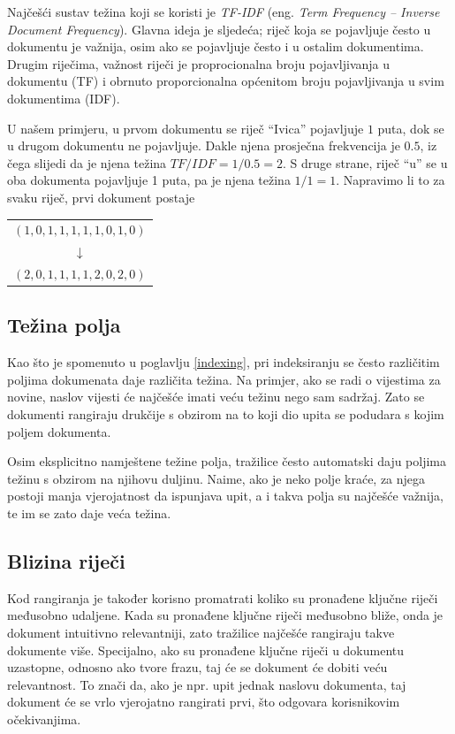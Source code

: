 \documentclass[a4paper,twoside,12pt]{scrreprt}
\newenvironment{nscenter}
 {\par\nopagebreak\centering}
 {\parskip=0pt\par\noindent\ignorespacesafterend}
\begin{document}
Najčešći sustav težina koji se koristi je \textit{TF-IDF} (eng. \textit{Term Frequency – Inverse Document Frequency}). Glavna ideja je sljedeća; riječ koja se pojavljuje često u dokumentu je važnija, osim ako se pojavljuje često i u ostalim dokumentima. Drugim riječima, važnost riječi je proprocionalna broju pojavljivanja u dokumentu (TF) i obrnuto proporcionalna općenitom broju pojavljivanja u svim dokumentima (IDF).

U našem primjeru, u prvom dokumentu se riječ ``Ivica'' pojavljuje $1$ puta, dok se u drugom dokumentu ne pojavljuje. Dakle njena prosječna frekvencija je $0.5$, iz čega slijedi da je njena težina $TF / IDF = 1 / 0.5 = 2$. S druge strane, riječ ``u'' se u oba dokumenta pojavljuje 1 puta, pa je njena težina $1 / 1 = 1$. Napravimo li to za svaku riječ, prvi dokument postaje

\begin{nscenter}
  \begin{tabular}{c}
    $(1,0,1,1,1,1,1,0,1,0)$ \\
    $\downarrow$            \\
    $(2,0,1,1,1,1,2,0,2,0)$ \\
  \end{tabular}
\end{nscenter}

\subsection{Težina polja}

Kao što je spomenuto u poglavlju \ref{indexing}, pri indeksiranju se često različitim poljima dokumenata daje različita težina. Na primjer, ako se radi o vijestima za novine, naslov vijesti će najčešće imati veću težinu nego sam sadržaj. Zato se dokumenti rangiraju drukčije s obzirom na to koji dio upita se podudara s kojim poljem dokumenta.

Osim eksplicitno namještene težine polja, tražilice često automatski daju poljima težinu s obzirom na njihovu duljinu. Naime, ako je neko polje kraće, za njega postoji manja vjerojatnost da ispunjava upit, a i takva polja su najčešće važnija, te im se zato daje veća težina.

\subsection{Blizina riječi}

Kod rangiranja je također korisno promatrati koliko su pronađene ključne riječi međusobno udaljene. Kada su pronađene ključne riječi međusobno bliže, onda je dokument intuitivno relevantniji, zato tražilice najčešće rangiraju takve dokumente više. Specijalno, ako su pronađene ključne riječi u dokumentu uzastopne, odnosno ako tvore frazu, taj će se dokument će dobiti veću relevantnost. To znači da, ako je npr. upit jednak naslovu dokumenta, taj dokument će se vrlo vjerojatno rangirati prvi, što odgovara korisnikovim očekivanjima.
\end{document}
